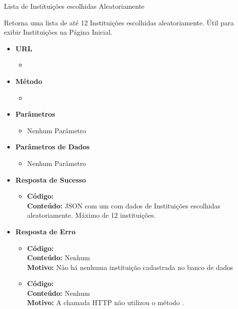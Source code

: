 
\begin{caixa}{Lista de Instituições escolhidas Aleatoriamente}{}

Retorna uma lista de até 12 Instituições escolhidas aleatoriamente. Útil para exibir Instituições na Página Inicial.

\begin{itemize}
\item \textbf{URL}
	\begin{itemize}
		\item {}
	\end{itemize}

\item \textbf{Método}
	\begin{itemize}
		\item {}
	\end{itemize}

\item \textbf{Parâmetros}
	\begin{itemize}
		\item Nenhum Parâmetro
	\end{itemize}

\item \textbf{Parâmetros de Dados}
	\begin{itemize}
		\item Nenhum Parâmetro
	\end{itemize}

\item \textbf{Resposta de Sucesso}
	\begin{itemize}
		\item \textbf{Código:}  \\ \textbf{Conteúdo:} JSON com um  com dados de Instituições escolhidas aleatoriamente. Máximo de 12 instituições.
	\end{itemize}

\item \textbf{Resposta de Erro}
	\begin{itemize}
		\item \textbf{Código:}  \\ \textbf{Conteúdo:} Nenhum \\ \textbf{Motivo:} Não há nenhuma instituição cadastrada no banco de dados
        \item \textbf{Código:}  \\ \textbf{Conteúdo:} Nenhum \\ \textbf{Motivo:} A chamada HTTP não utilizou o método .
	\end{itemize}

\end{itemize}
\end{caixa}

